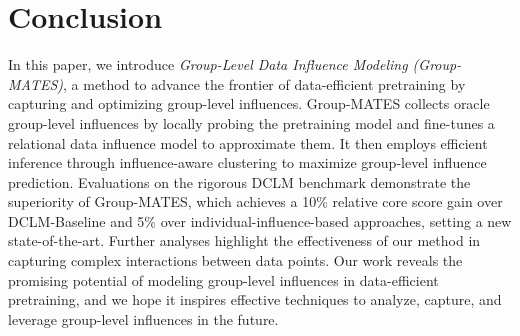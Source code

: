 \section{Conclusion}


In this paper, we introduce \textit{Group-Level Data Influence Modeling (Group-MATES)}, a method to advance the frontier of data-efficient pretraining by capturing and optimizing group-level influences. Group-MATES collects oracle group-level influences by locally probing the pretraining model and fine-tunes a relational data influence model to approximate them.
It then employs efficient inference through influence-aware clustering to maximize group-level influence prediction.
Evaluations on the rigorous DCLM benchmark demonstrate the superiority of Group-MATES, which achieves a 10\% relative core score gain over DCLM-Baseline and 5\% over individual-influence-based approaches, setting a new state-of-the-art.
Further analyses highlight the effectiveness of our method in capturing complex interactions between data points.
Our work reveals the promising potential of modeling group-level influences in data-efficient pretraining, and we hope it inspires effective techniques to analyze, capture, and leverage group-level influences in the future.
